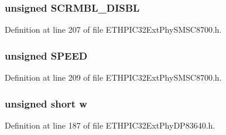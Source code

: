 \subsubsection[{S\+C\+R\+M\+B\+L\+\_\+\+D\+I\+S\+B\+L}]{\setlength{\rightskip}{0pt plus 5cm}unsigned S\+C\+R\+M\+B\+L\+\_\+\+D\+I\+S\+B\+L}\label{union_____p_h_y_c_t_r_lbits__t_a55219a321aa70bccb26465498f8caaf0}


Definition at line 207 of file E\+T\+H\+P\+I\+C32\+Ext\+Phy\+S\+M\+S\+C8700.\+h.

\hypertarget{union_____p_h_y_c_t_r_lbits__t_a95fd4dafd860304d6b44d4fb14881daa}{}
\subsubsection[{S\+P\+E\+E\+D}]{\setlength{\rightskip}{0pt plus 5cm}unsigned S\+P\+E\+E\+D}\label{union_____p_h_y_c_t_r_lbits__t_a95fd4dafd860304d6b44d4fb14881daa}


Definition at line 209 of file E\+T\+H\+P\+I\+C32\+Ext\+Phy\+S\+M\+S\+C8700.\+h.

\hypertarget{union_____p_h_y_c_t_r_lbits__t_a160850a4684a3e82c2323033964f2e98}{}
\subsubsection[{w}]{\setlength{\rightskip}{0pt plus 5cm}unsigned short w}\label{union_____p_h_y_c_t_r_lbits__t_a160850a4684a3e82c2323033964f2e98}


Definition at line 187 of file E\+T\+H\+P\+I\+C32\+Ext\+Phy\+D\+P83640.\+h.



